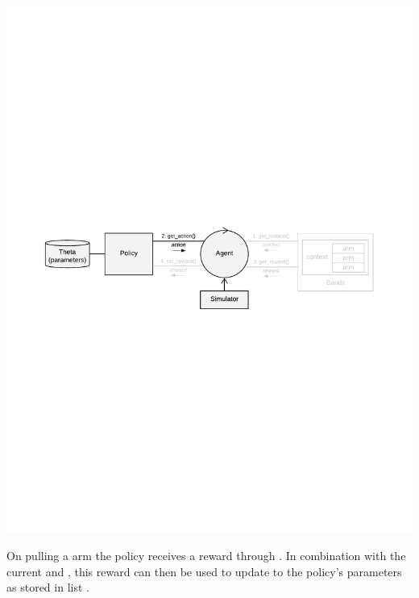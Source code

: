 \documentclass{jss}
\begin{document}
\includegraphics[width=\textwidth]{fig/all_cmab_phases_Part4}

On pulling a  arm the policy receives a  reward through . In combination with the current  and , this reward can then be used to update to the policy's parameters as stored in list .
\end{document}
